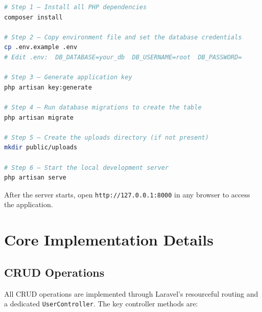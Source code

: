 \documentclass[12pt,a4paper]{report}
\begin{document}
\begin{lstlisting}[language=bash, caption={Project Setup Commands}]
# Step 1 – Install all PHP dependencies
composer install

# Step 2 – Copy environment file and set the database credentials
cp .env.example .env
# Edit .env:  DB_DATABASE=your_db  DB_USERNAME=root  DB_PASSWORD=

# Step 3 – Generate application key
php artisan key:generate

# Step 4 – Run database migrations to create the table
php artisan migrate

# Step 5 – Create the uploads directory (if not present)
mkdir public/uploads

# Step 6 – Start the local development server
php artisan serve
\end{lstlisting}

After the server starts, open \texttt{http://127.0.0.1:8000} in any browser to
access the application.

\section{Core Implementation Details}

\subsection{CRUD Operations}

All CRUD operations are implemented through Laravel's resourceful routing and a
dedicated \texttt{UserController}. The key controller methods are:
\end{document}
